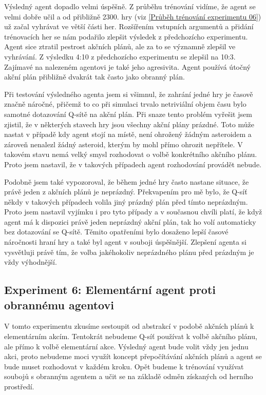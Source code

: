 Výsledný agent dopadlo velmi úspěšně. Z průběhu trénování vidíme, že agent se velmi dobře učil a od přibližně 2300. hry (viz \ref{Průběh trénování experimentu 06}) už začal vyhrávat ve větší části her.
Rozšířením vstupních argumentů a přidání trénovacích her se nám podařilo zlepšit výsledek z předchozícho experimentu.
Agent sice ztratil pestrost akčních plánů, ale za to se významně zlepšil ve vyhrávání. Z výsledku 4:10 z předchozícho experimentu se zlepšil na 10:3.
Zajímavé na nalezeném agentovi je také jeho agresivita. Agent používá útočný akční plán přibližně dvakrát tak často jako obranný plán.

Při testování výsledného agenta jsem si všimnul, že zahrání jedné hry je časově značně náročné, přičemž to co při simulaci trvalo netriviální objem času bylo samotné dotazování Q-sítě na akční plán.
Při snaze tento problém vyřešit jsem zjistil, že v některých stavech hry jsou všechny akční plány prázdné. 
Toto může nastat v případě kdy agent stojí na místě, není ohrožený žádným asteroidem a zároveň nenalezl žádný asteroid, kterým by mohl přímo ohrozit nepřítele.
V takovém stavu nemá velký smysl rozhodovat o volbě konkrétního akčního plánu. Proto jsem nastavil, že v takových případech agent rozhodování provádět nebude.

Podobně jsem také vypozoroval, že během jedné hry často nastane situace, že právě jeden z akčních plánů je neprázdný. Překvapením pro mě bylo, že Q-síť někdy v takových případech volila jiný prázdný plán před tímto neprázdným.
Proto jsem nastavil vyjímku i pro tyto případy a v současnou chvíli platí, že když agent má k dispozici právě jeden neprázdný akční plán, tak ho volí automaticky bez dotazování se Q-sítě.
Těmito opatřeními bylo dosaženo lepší časové náročnosti hraní hry a také byl agent v souboji úspěšnější. Zlepšení agenta si vysvětluji právě tím, že volba jakéhokoliv neprázdného plánu před prázdným je vždy výhodnější.


\newpage
\subsection{Experiment 6: Elementární agent proti obrannému agentovi}
V tomto experimentu zkusíme sestoupit od abstrakcí v podobě akčních plánů k elementárním akcím.
Tentokrát nebudeme Q-síť používat k volbě akčního plánu, ale přímo k volbě elementární akce.
Výsledný agent bude volit vždy jen jednu akci, proto nebudeme moci využít koncept přepočítávání akčních plánů a agent se bude muset rozhodovat v každém kroku.
Opět budeme k trénování využívat soubojů s obranným agentem a učit se na základě odměn získaných od herního prostředí.

